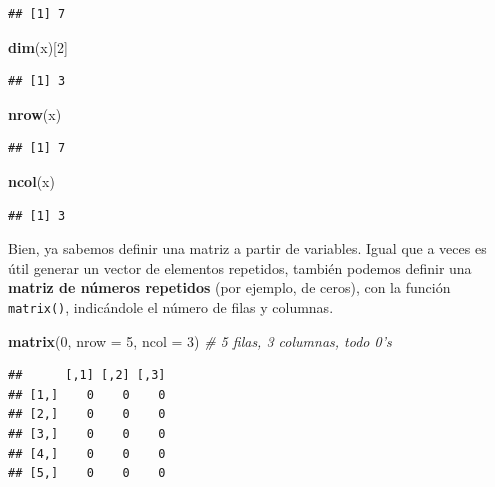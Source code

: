 \documentclass[11pt,]{book}
\newenvironment{Shaded}{\begin{snugshade}}{\end{snugshade}}
\newcommand{\CommentTok}[1]{\textcolor[rgb]{0.37,0.37,0.37}{\textit{#1}}}
\newcommand{\DataTypeTok}[1]{\textcolor[rgb]{0.27,0.27,0.27}{#1}}
\newcommand{\DecValTok}[1]{\textcolor[rgb]{0.06,0.06,0.06}{#1}}
\newcommand{\KeywordTok}[1]{\textcolor[rgb]{0.27,0.27,0.27}{\textbf{#1}}}
\newcommand{\NormalTok}[1]{#1}
\begin{document}
\begin{verbatim}
## [1] 7
\end{verbatim}

\begin{Shaded}
\begin{Highlighting}[]
\KeywordTok{dim}\NormalTok{(x)[}\DecValTok{2}\NormalTok{]}
\end{Highlighting}
\end{Shaded}

\begin{verbatim}
## [1] 3
\end{verbatim}

\begin{Shaded}
\begin{Highlighting}[]
\KeywordTok{nrow}\NormalTok{(x)}
\end{Highlighting}
\end{Shaded}

\begin{verbatim}
## [1] 7
\end{verbatim}

\begin{Shaded}
\begin{Highlighting}[]
\KeywordTok{ncol}\NormalTok{(x)}
\end{Highlighting}
\end{Shaded}

\begin{verbatim}
## [1] 3
\end{verbatim}

Bien, ya sabemos definir una matriz a partir de variables. Igual que a veces es útil generar un vector de elementos repetidos, también podemos definir una \textbf{matriz de números repetidos} (por ejemplo, de ceros), con la función \texttt{matrix()}, indicándole el número de filas y columnas.

\begin{Shaded}
\begin{Highlighting}[]
\KeywordTok{matrix}\NormalTok{(}\DecValTok{0}\NormalTok{, }\DataTypeTok{nrow =} \DecValTok{5}\NormalTok{, }\DataTypeTok{ncol =} \DecValTok{3}\NormalTok{) }\CommentTok{# 5 filas, 3 columnas, todo 0's}
\end{Highlighting}
\end{Shaded}

\begin{verbatim}
##      [,1] [,2] [,3]
## [1,]    0    0    0
## [2,]    0    0    0
## [3,]    0    0    0
## [4,]    0    0    0
## [5,]    0    0    0
\end{verbatim}
\end{document}

